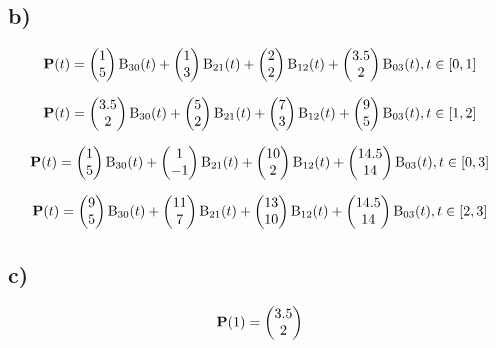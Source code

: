 \bigskip





\subsection*{b)}

\begin{equation}
{\bf P}(t) = \vect{1\\5} \text{B}_{30}(t) + \vect{1\\3} \text{B}_{21}(t) + \vect{2\\2} \text{B}_{12}(t) + \vect{3.5\\2} \text{B}_{03}(t) , t \in [0,1]
\end{equation}


\begin{equation}
{\bf P}(t) = \vect{3.5\\2} \text{B}_{30}(t) + \vect{5\\2} \text{B}_{21}(t) + \vect{7\\3} \text{B}_{12}(t) + \vect{9\\5} \text{B}_{03}(t) , t \in [1,2]
\end{equation}

\begin{equation}
{\bf P}(t) = \vect{1\\5} \text{B}_{30}(t) + \vect{1\\-1} \text{B}_{21}(t) + \vect{10\\2} \text{B}_{12}(t) + \vect{14.5\\14} \text{B}_{03}(t) , t \in [0,3]
\end{equation}

\begin{equation}
{\bf P}(t) = \vect{9\\5} \text{B}_{30}(t) + \vect{11\\7} \text{B}_{21}(t) + \vect{13\\10} \text{B}_{12}(t) + \vect{14.5\\14} \text{B}_{03}(t) , t \in [2,3]
\end{equation}


\subsection*{c)}

\begin{equation}
{\bf P}(1) = \vect{3.5\\2} 
\end{equation}

